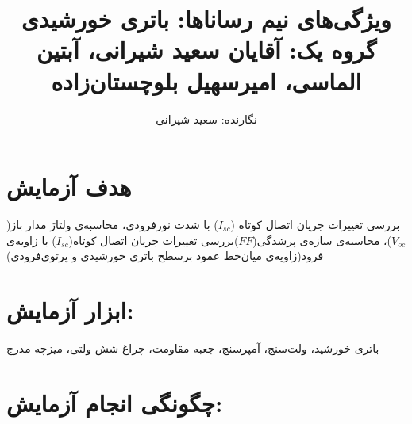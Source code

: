 \documentclass{article}
\begin{document}
	
	\title {ویژگی‌های نیم رساناها: باتری‌ خورشیدی\\
		\vspace{0.5cm}
		\large گروه یک: آقایان سعید شیرانی، آبتین الماسی، امیرسهیل بلوچستان‌زاده\\}
	
	\author{نگارنده: سعید شیرانی} 
	
	\affil{ }
	\maketitle
	\newpage{}
	\normalsize 
	
	\section{هدف آزمایش}
	\vspace{5mm}
	\normalsize
	
	بررسی تغییرات جریان اتصال کوتاه ($I_{sc}$) با شدت نور‌فرودی، محاسبه‌ی ولتاژ مدار باز($V_{oc}$)، محاسبه‌ی سازه‌ی پرشدگی($FF$)بررسی تغییرات جریان اتصال کوتاه($I_{sc}$) با زاویه‌‌ی فرود(زاویه‌ی میان‌خط عمود برسطح باتری خورشیدی و پرتوی‌فرودی)
	
	\section{ابزار آزمایش:}
	باتری خورشید، ولت‌سنج، آمپرسنج، جعبه مقاومت، چراغ شش ولتی، میزچه مدرج
	\section{چگونگی انجام آزمایش:}
	
\end{document}
